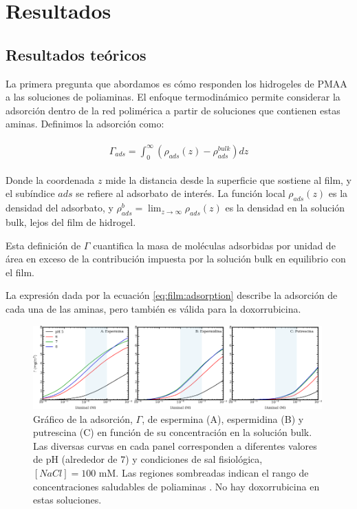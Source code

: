 




\section{Resultados} \label{sec:film:resultados}

\subsection{Resultados te\'oricos}

La primera pregunta que abordamos es c\'omo responden los hidrogeles de PMAA a las soluciones de poliaminas. El enfoque termodin\'amico permite considerar la adsorci\'on dentro de la red polim\'erica a partir de soluciones que contienen estas aminas. Definimos la adsorci\'on como:

\begin{align}
	\begin{aligned}
		\Gamma_{ads}= \int_0^\infty{(\rho_{ads}(z) -\rho_{ads}^{bulk})dz}
	\end{aligned}
	\label{eq:film:adsorption}
\end{align}


\noindent Donde la coordenada $z$ mide la distancia desde la superficie que sostiene al film, y el sub\'indice $ads$ se refiere al adsorbato de inter\'es. 
La funci\'on local $\rho_{ads}(z)$ es la densidad del adsorbato, y $\rho_{ads}^b=\lim_{z\to\infty} \rho_{ads}(z)$ es la densidad en la soluci\'on bulk, lejos del film  de hidrogel. 

Esta definici\'on de $\Gamma$ cuantifica la masa de mol\'eculas adsorbidas por unidad de \'area en exceso de la contribuci\'on impuesta por la soluci\'on bulk en equilibrio con el film.

La expresi\'on dada por la ecuaci\'on \ref{eq:film:adsorption} describe la adsorci\'on de cada una de las aminas, pero tambi\'en es v\'alida para la doxorrubicina.


\begin{figure}[!htb]
	\centering
	\includegraphics[width=0.99\textwidth]{Figures/graph-film/amines_ads.pdf}
	\caption{Gr\'afico de la adsorci\'on, $\Gamma$, de espermina (A), espermidina (B) y putrescina (C) en funci\'on de su concentraci\'on en la soluci\'on bulk.
		Las diversas curvas en cada panel corresponden a diferentes valores de pH (alrededor de $7$) y condiciones de sal fisiol\'ogica, $[NaCl]=100$ mM. Las regiones sombreadas indican el rango de concentraciones saludables de poliaminas \cite{Soda2011}.
		No hay doxorrubicina en estas soluciones.}
	\label{fig:film:amines-ads}
\end{figure}





